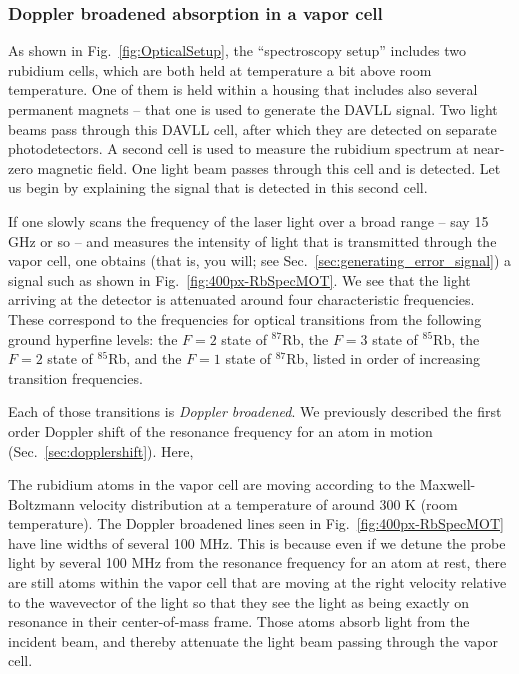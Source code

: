 \documentclass{../lab}
\begin{document}
\subsubsection{Doppler broadened absorption in a vapor cell}

As shown in Fig.\ \ref{fig:OpticalSetup}, the ``spectroscopy setup'' includes two rubidium cells, which are both held at temperature a bit above room temperature.  One of them is held within a housing that includes also several permanent magnets -- that one is used to generate the DAVLL signal.  Two light beams pass through this DAVLL cell, after which they are detected on separate photodetectors.  A second cell is used to measure the rubidium spectrum at near-zero magnetic field.   One light beam passes through this cell and is detected.  Let us begin by explaining the signal that is detected in this second cell.

If one slowly scans the frequency of the laser light over a broad range -- say 15 GHz or so -- and measures the intensity of light that is transmitted through the vapor cell, one obtains (that is, you will; see Sec.\ \ref{sec:generating_error_signal}) a signal such as shown in Fig.\ \ref{fig:400px-RbSpecMOT}.  We see that the light arriving at the detector is attenuated around four characteristic frequencies.  These correspond to the frequencies for optical transitions from the following ground hyperfine levels: the $F=2$ state of $^{87}$Rb, the $F=3$ state of  $^{85}$Rb, the $F=2$ state of  $^{85}$Rb, and the  $F=1$ state of  $^{87}$Rb, listed in order of increasing transition frequencies.

Each of those transitions is \emph{Doppler broadened}.  We previously described the first order Doppler shift of the resonance frequency for an atom in motion (Sec.\ \ref{sec:dopplershift}).  Here, 

The rubidium atoms in the vapor cell are moving according to the Maxwell-Boltzmann velocity distribution at a temperature of around 300 K (room temperature).  The Doppler broadened lines seen in Fig.\ \ref{fig:400px-RbSpecMOT} have line widths of several 100 MHz.  This is because even if we detune the probe light by several 100 MHz from the resonance frequency for an atom at rest, there are still atoms within the vapor cell that are moving at the right velocity relative to the wavevector of the light so that they see the light as being exactly on resonance in their center-of-mass frame.  Those atoms absorb light from the incident beam, and thereby attenuate the light beam passing through the vapor cell.
\end{document}
